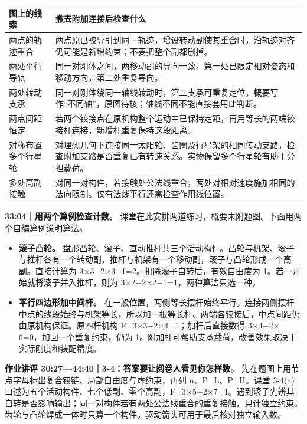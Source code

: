 \documentclass[zihao=5,a4paper,UTF8,fontset=fandol]{ctexart}
\begin{document}
\begin{longtable}{p{7.51cm}p{7.51cm}}
\toprule
图上的线索 & 撤去附加连接后检查什么 \\

\midrule
\endhead
两点的轨迹重合 & 两点原已被导引到同一轨迹，增设转动副使其重合时，沿轨迹对齐仍可能是新增约束；不要把整个副都删掉。 \\
两处平行导轨 & 同一对刚体之间，两移动副的导向一致，第一处已限定相对姿态和移动方向，第二处重复导向。 \\
两处转动支承 & 同一对刚体绕同一轴线转动时，第二支承可重复定位。概要写作“不同轴”，原图待核；轴线不同不能直接套用此判断。 \\
两点间距恒定 & 若两个铰接点在原机构整个运动中已保持定距，再用等长的两端铰接杆连接，新增杆重复保持这段距离。 \\
对称布置多个行星轮 & 对理想几何下连接同一太阳轮、齿圈及行星架的相同传动支路，检查附加支路是否重复已有转速关系。实物保留多个行星轮有助于分担载荷。 \\
多处高副接触 & 对同一对构件，若接触处公法线重合，两处对相对速度施加相同的法向限制。仅有法线平行还需检查作用线位置。 \\
\bottomrule
\end{longtable}

\textbf{33:04｜用两个算例检查计数。} 课堂在此安排两道练习，概要未附题图。下面用两个自编算例说明算法。


\begin{itemize}
\item 
\textbf{滚子凸轮。} 盘形凸轮、滚子、直动推杆共三个活动构件。凸轮与机架、滚子与推杆各有一个转动副，推杆与机架有一个移动副，滚子与凸轮形成一个高副。直接计算为 3$\times$3$-$2$\times$3$-$1=2。扣除滚子自转后，有效自由度为 1。若一开始就将滚子并入推杆，则为 3$\times$2$-$2$\times$2$-$1=1，两种算法只选一种。


\item 
\textbf{平行四边形加中间杆。} 在一般位置，两侧等长摆杆始终平行。连接两侧摆杆中点的线段始终与机架等长，所以加一根等长杆、两端各铰接后，中点间距仍由原机构保证。原四杆机构 F=3$\times$3$-$2$\times$4=1；加杆后直接数得 3$\times$4$-$2$\times$6=0，加回一个重复约束，仍为 1。附加杆可帮助支承载荷，改善效果取决于实际刚度和装配精度。



\end{itemize}

\textbf{作业讲评 30:27—44:40｜3-4：答案要让阅卷人看见你怎样数。} 先在题图上用节点字母标出复合铰链、局部自由度与虚约束，再列 n、P\_L、P\_H。课堂 3-4(a) 口述为五个活动构件、七个低副、零个高副，F=3$\times$5$-$2$\times$7=1。遇到滚子先辨其自转是否影响输出；同一对构件若有两处公法线重合的重复接触，只计独立约束。齿轮与凸轮焊成一体时只算一个构件。驱动箭头可用于最后核对独立输入数。
\end{document}
